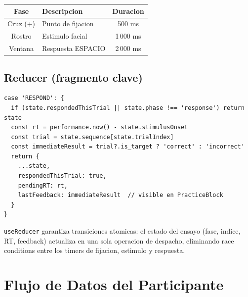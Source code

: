 \documentclass[12pt,a4paper]{article}
\begin{document}
\begin{tcolorbox}[infobox, title={Temporizado por ensayo (3500 ms totales)}]
\centering
\begin{tabular}{clc}
\toprule
Fase & Descripcion & Duracion \\
\midrule
Cruz (+) & Punto de fijacion & 500 ms \\
Rostro   & Estimulo facial   & 1\,000 ms \\
Ventana  & Respuesta ESPACIO & 2\,000 ms \\
\bottomrule
\end{tabular}
\end{tcolorbox}

\subsection{Reducer (fragmento clave)}

\begin{lstlisting}[caption={Caso RESPOND en useExperimentEngine.js}]
case 'RESPOND': {
  if (state.respondedThisTrial || state.phase !== 'response') return state
  const rt = performance.now() - state.stimulusOnset
  const trial = state.sequence[state.trialIndex]
  const immediateResult = trial?.is_target ? 'correct' : 'incorrect'
  return {
    ...state,
    respondedThisTrial: true,
    pendingRT: rt,
    lastFeedback: immediateResult  // visible en PracticeBlock
  }
}
\end{lstlisting}

\begin{tcolorbox}[infobox, title={Por que useReducer y no useState?}]
\texttt{useReducer} garantiza transiciones atomicas: el estado del ensayo
(fase, indice, RT, feedback) actualiza en una sola operacion de despacho,
eliminando race conditions entre los timers de fijacion, estimulo y respuesta.
\end{tcolorbox}

\section{Flujo de Datos del Participante}
\end{document}
